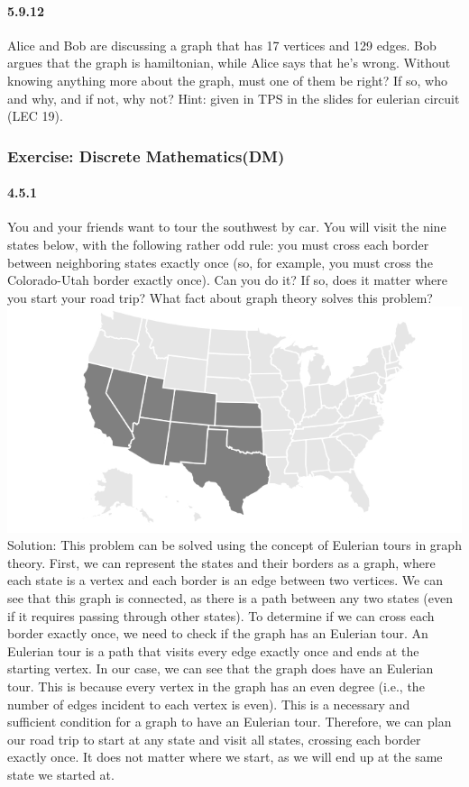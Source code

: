\documentclass{article}
\begin{document}
\paragraph{5.9.12}
Alice and Bob are discussing a graph that has 17 vertices and 129 edges. Bob argues that the graph is hamiltonian, while Alice says that he’s wrong. Without knowing anything more about the graph, must one of them be right? If so, who and why, and if not, why not?\newline
Hint:
given in TPS in the slides for eulerian circuit (LEC 19).
\subsubsection{Exercise: Discrete Mathematics(DM)}
\paragraph{4.5.1}
You and your friends want to tour the southwest by car. You will visit the nine states below, with the following rather odd rule: you must cross each border between neighboring states exactly once (so, for example, you must cross the Colorado-Utah border exactly once). Can you do it? If so, does it matter where you start your road trip? What fact about graph theory solves this problem?\newline
\includegraphics{0077}\newline
Solution:\newline
This problem can be solved using the concept of Eulerian tours in graph theory.
\newline
First, we can represent the states and their borders as a graph, where each state is a vertex and each border is an edge between two vertices. We can see that this graph is connected, as there is a path between any two states (even if it requires passing through other states).
\newline
To determine if we can cross each border exactly once, we need to check if the graph has an Eulerian tour. An Eulerian tour is a path that visits every edge exactly once and ends at the starting vertex.
\newline
In our case, we can see that the graph does have an Eulerian tour. This is because every vertex in the graph has an even degree (i.e., the number of edges incident to each vertex is even). This is a necessary and sufficient condition for a graph to have an Eulerian tour.
\newline
Therefore, we can plan our road trip to start at any state and visit all states, crossing each border exactly once. It does not matter where we start, as we will end up at the same state we started at.
\end{document}
